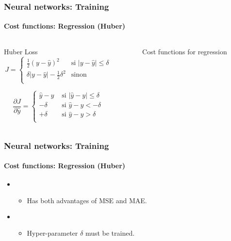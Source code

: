 \documentclass[xcolor=table]{beamer}
\begin{document}
\begin{frame}
	\frametitle{Neural networks: Training}
	\framesubtitle{Cost functions: Regression (Huber)}

\begin{columns}
\begin{column}{.68\linewidth}
\begin{block}{Huber Loss}
	\[J = %
	\begin{cases}
	\frac{1}{2} (y - \hat{y})^2 & \text{si } |y - \hat{y}| \le \delta \\
	\delta |y - \hat{y}| - \frac{1}{2} \delta^2 & \text{sinon }\\
	\end{cases}
	\]
	
	\[
	\frac{\partial J}{\partial \hat{y}} = 
	\begin{cases}
	\hat{y} - y & \text{ si } |\hat{y} - y| \le \delta \\
	-\delta & \text{ si } \hat{y} - y < -\delta \\
	+\delta & \text{ si } \hat{y} - y > \delta \\
	\end{cases}
	\]
	
\end{block}

\end{column}%
\begin{column}{.3\linewidth}
\begin{figure}
	\caption{Cost functions for regression \cite{2017-rosenberg}}
\end{figure}
\end{column}
\end{columns}

\end{frame}

\begin{frame}
	\frametitle{Neural networks: Training}
	\framesubtitle{Cost functions: Regression (Huber)}

\begin{itemize}
	\item {}
	\begin{itemize}
		\item Has both advantages of MSE and MAE.
	\end{itemize}
	\item {}
	\begin{itemize}
		\item Hyper-parameter $\delta$ must be trained.
	\end{itemize}
\end{itemize}

\end{frame}
\end{document}
